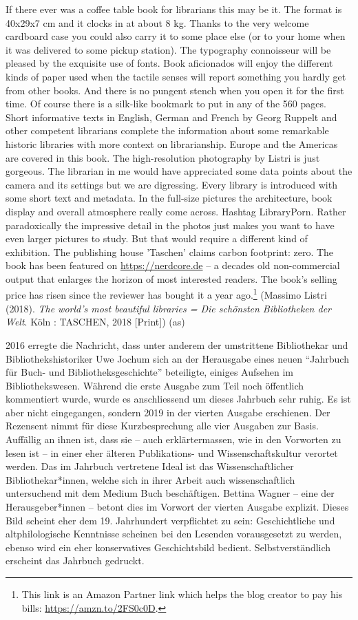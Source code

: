 \documentclass[a4paper,
fontsize=11pt,
oneside,
numbers=noperiodatend,
parskip=half-,
bibliography=totoc,
final
]{scrartcl}
\begin{document}
If there ever was a coffee table book for librarians this may be it. The
format is 40x29x7 cm and it clocks in at about 8 kg. Thanks to the very
welcome cardboard case you could also carry it to some place else (or to
your home when it was delivered to some pickup station). The typography
connoisseur will be pleased by the exquisite use of fonts. Book
aficionados will enjoy the different kinds of paper used when the
tactile senses will report something you hardly get from other books.
And there is no pungent stench when you open it for the first time. Of
course there is a silk-like bookmark to put in any of the 560 pages.
Short informative texts in English, German and French by Georg Ruppelt
and other competent librarians complete the information about some
remarkable historic libraries with more context on librarianship. Europe
and the Americas are covered in this book. The high-resolution
photography by Listri is just gorgeous. The librarian in me would have
appreciated some data points about the camera and its settings but we
are digressing. Every library is introduced with some short text and
metadata. In the full-size pictures the architecture, book display and
overall atmosphere really come across. Hashtag LibraryPorn. Rather
paradoxically the impressive detail in the photos just makes you want to
have even larger pictures to study. But that would require a different
kind of exhibition. The publishing house 'Taschen' claims carbon
footprint: zero. The book has been featured on \url{https://nerdcore.de}
-- a decades old non-commercial output that enlarges the horizon of most
interested readers. The book's selling price has risen since the
reviewer has bought it a year ago.\footnote{This link is an Amazon
  Partner link which helps the blog creator to pay his bills:
  \url{https://amzn.to/2FS0c0D}.} (Massimo Listri (2018). \emph{The
world's most beautiful libraries = Die schönsten Bibliotheken der Welt}.
Köln : TASCHEN, 2018 {[}Print{]}) (as)

2016 erregte die Nachricht, dass unter anderem der umstrittene
Bibliothekar und Bibliothekshistoriker Uwe Jochum sich an der Herausgabe
eines neuen \enquote{Jahrbuch für Buch- und Bibliotheksgeschichte}
beteiligte, einiges Aufsehen im Bibliothekswesen. Während die erste
Ausgabe zum Teil noch öffentlich kommentiert wurde, wurde es
anschliessend um dieses Jahrbuch sehr ruhig. Es ist aber nicht
eingegangen, sondern 2019 in der vierten Ausgabe erschienen. Der
Rezensent nimmt für diese Kurzbesprechung alle vier Ausgaben zur Basis.
Auffällig an ihnen ist, dass sie -- auch erklärtermassen, wie in den
Vorworten zu lesen ist -- in einer eher älteren Publikations- und
Wissenschaftskultur verortet werden. Das im Jahrbuch vertretene Ideal
ist das Wissenschaftlicher Bibliothekar*innen, welche sich in ihrer
Arbeit auch wissenschaftlich untersuchend mit dem Medium Buch
beschäftigen. Bettina Wagner -- eine der Herausgeber*innen -- betont
dies im Vorwort der vierten Ausgabe explizit. Dieses Bild scheint eher
dem 19. Jahrhundert verpflichtet zu sein: Geschichtliche und
altphilologische Kenntnisse scheinen bei den Lesenden vorausgesetzt zu
werden, ebenso wird ein eher konservatives Geschichtsbild bedient.
Selbstverständlich erscheint das Jahrbuch gedruckt.
\end{document}
